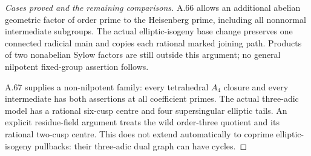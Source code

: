 \begin{proof}[Cases proved and the remaining comparisons]
A.66 allows an additional abelian geometric factor of order prime to
the Heisenberg prime, including all nonnormal intermediate subgroups.
The actual elliptic-isogeny base change preserves one connected
radicial main and copies each rational marked joining path.
Products of two nonabelian Sylow factors are still outside this
argument; no general nilpotent fixed-group assertion follows.

A.67 supplies a non-nilpotent family: every tetrahedral
\(A_4\) closure and every intermediate has both assertions at
all coefficient primes. The actual three-adic model has a
rational six-cusp centre and four supersingular elliptic
tails. An explicit residue-field argument treats the wild
order-three quotient and its rational two-cusp centre.
This does not extend automatically to coprime elliptic-isogeny
pullbacks: their three-adic dual graph can have cycles.


\end{proof}
